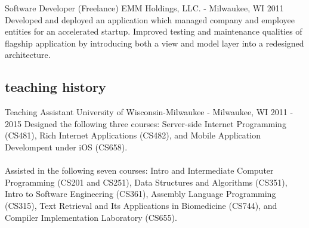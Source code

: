 \documentclass[]{fritz-resume}
\begin{document}
\entry
  {Software Developer (Freelance)}
  {EMM Holdings, LLC. - Milwaukee, WI}
  {2011}
  {
    Developed and deployed an application which managed company and employee entities for an accelerated startup. Improved testing and maintenance qualities of flagship application by introducing both a view and model layer into a redesigned architecture.
  }

\subsection{teaching history}

\entry
  {Teaching Assistant}
  {University of Wisconsin-Milwaukee - Milwaukee, WI}
  {2011 - 2015}
  {
    Designed the following three courses: Server-side Internet Programming (CS481), Rich Internet Applications (CS482), and Mobile Application Develompent under iOS (CS658). \\\\ Assisted in the following seven courses: Intro and Intermediate Computer Programming (CS201 and CS251), Data Structures and Algorithms (CS351), Intro to Software Engineering (CS361), Assembly Language Programming (CS315), Text Retrieval and Its Applications in Biomedicine (CS744), and Compiler Implementation Laboratory (CS655).
  }


\end{document}
